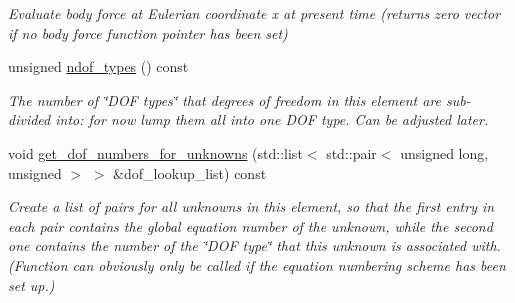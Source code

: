 \begin{DoxyCompactItemize}
\begin{DoxyCompactList}\small\item\em Evaluate body force at Eulerian coordinate x at present time (returns zero vector if no body force function pointer has been set) \end{DoxyCompactList}\item 
unsigned \hyperlink{classoomph_1_1TimeHarmonicFourierDecomposedLinearElasticityEquationsBase_a7fc55ec08c580274e0f0de664c43c249}{ndof\+\_\+types} () const
\begin{DoxyCompactList}\small\item\em The number of \char`\"{}\+D\+O\+F types\char`\"{} that degrees of freedom in this element are sub-\/divided into\+: for now lump them all into one D\+OF type. Can be adjusted later. \end{DoxyCompactList}\item 
void \hyperlink{classoomph_1_1TimeHarmonicFourierDecomposedLinearElasticityEquationsBase_ae49e9b233a22735986bf1bc3ef31502f}{get\+\_\+dof\+\_\+numbers\+\_\+for\+\_\+unknowns} (std\+::list$<$ std\+::pair$<$ unsigned long, unsigned $>$ $>$ \&dof\+\_\+lookup\+\_\+list) const
\begin{DoxyCompactList}\small\item\em Create a list of pairs for all unknowns in this element, so that the first entry in each pair contains the global equation number of the unknown, while the second one contains the number of the \char`\"{}\+D\+O\+F type\char`\"{} that this unknown is associated with. (Function can obviously only be called if the equation numbering scheme has been set up.) \end{DoxyCompactList}\end{DoxyCompactItemize}
